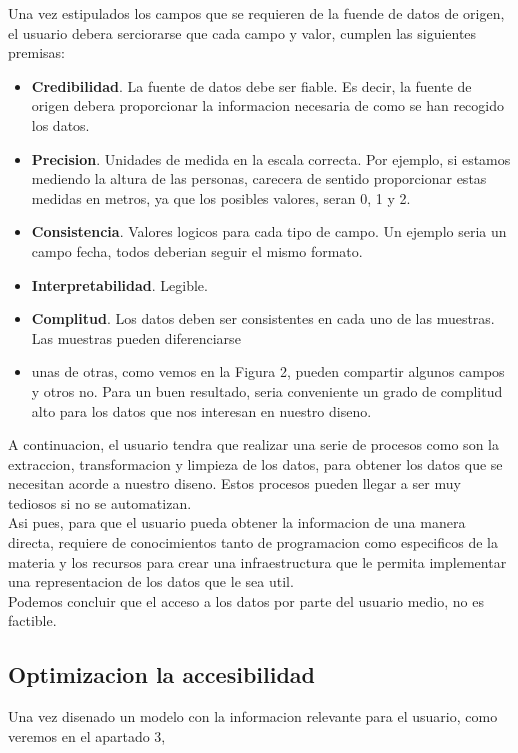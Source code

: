    
Una vez estipulados los campos que se requieren de la fuende de datos de origen, el usuario debera serciorarse que 
cada campo y valor, cumplen las siguientes premisas:
    \begin{itemize}
        \item \textbf{Credibilidad}. La fuente de datos debe ser fiable. Es decir, la fuente de origen debera
         proporcionar la informacion necesaria de como se han recogido los datos.
        \item \textbf{Precision}. Unidades de medida en la escala correcta. Por ejemplo, si estamos mediendo la altura
        de las personas, carecera de sentido proporcionar estas medidas en metros, ya que los posibles valores, seran 0, 1 y 2.
        \item \textbf{Consistencia}. Valores logicos para cada tipo de campo. Un ejemplo seria un campo fecha, todos deberian
        seguir el mismo formato.
        \item \textbf{Interpretabilidad}. Legible. 
        \item \textbf{Complitud}. Los datos deben ser consistentes en cada uno de las muestras. Las muestras pueden diferenciarse
        \item unas de otras, como vemos en la Figura 2, pueden compartir algunos campos y otros no. Para un buen resultado, seria 
        conveniente un grado de complitud alto para los datos que nos interesan en nuestro diseno.
    \end{itemize}

    
A continuacion, el usuario tendra que realizar una serie de procesos como son  la extraccion, transformacion y 
limpieza de los datos, para obtener los datos que se necesitan acorde a nuestro diseno. Estos procesos pueden llegar
a ser muy tediosos si no se automatizan.\\
    
    
Asi pues, para que el usuario pueda obtener la informacion de una manera directa, requiere de conocimientos tanto 
de programacion como especificos de la materia y los recursos para crear una infraestructura que le permita implementar 
una representacion de los datos que le sea util.\\

Podemos concluir que el acceso a los datos por parte del usuario medio, no es factible.\\


\subsection{Optimizacion la accesibilidad}
 Una vez disenado un modelo con la informacion relevante para el usuario, como veremos en el apartado 3,    
    
